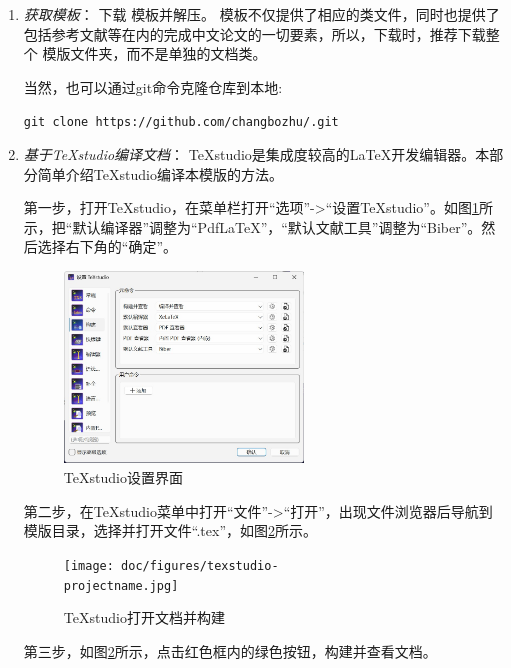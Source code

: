 \begin{enumerate}
    \item \emph{获取模板}：
        下载 \href{https://github.com/changbozhu/\projectname}{\projectname} 模板并解压。 \projectname 模板不仅提供了相应的类文件，同时也提供了包括参考文献等在内的完成中文论文的一切要素，所以，下载时，推荐下载整个 \projectname 模版文件夹，而不是单独的文档类。

        当然，也可以通过git命令克隆仓库到本地: 
        
        \texttt{git clone https://github.com/changbozhu/\projectname.git}
       
    
    \item \emph{基于TeXstudio编译文档}：
        TeXstudio是集成度较高的\LaTeX{}开发编辑器。本部分简单介绍TeXstudio编译本模版的方法。
        
        第一步，打开TeXstudio，在菜单栏打开“选项”->“设置TeXstudio”。如图\ref{fig:texstudio-setup}所示，把“默认编译器”调整为“PdfLaTeX”，“默认文献工具”调整为“Biber”。然后选择右下角的“确定”。
        \begin{figure}[!hptb]
            \centering
            \includegraphics[width=0.6\textwidth]{doc/figures/texstudio-setup.jpg}
            \caption{TeXstudio设置界面}
            \label{fig:texstudio-setup}
        \end{figure}

        第二步，在TeXstudio菜单中打开“文件”->“打开”，出现文件浏览器后导航到模版目录，选择并打开文件“\projectname.tex”，如图\ref{fig:texstudio-doc}所示。
        \begin{figure}[!hptb]
            \centering
            \texttt{[image: doc/figures/texstudio-\\projectname.jpg]}
            \caption{TeXstudio打开文档并构建}
            \label{fig:texstudio-doc}
        \end{figure}

        第三步，如图\ref{fig:texstudio-doc}所示，点击红色框内的绿色按钮，构建并查看文档。
    

\end{enumerate}
